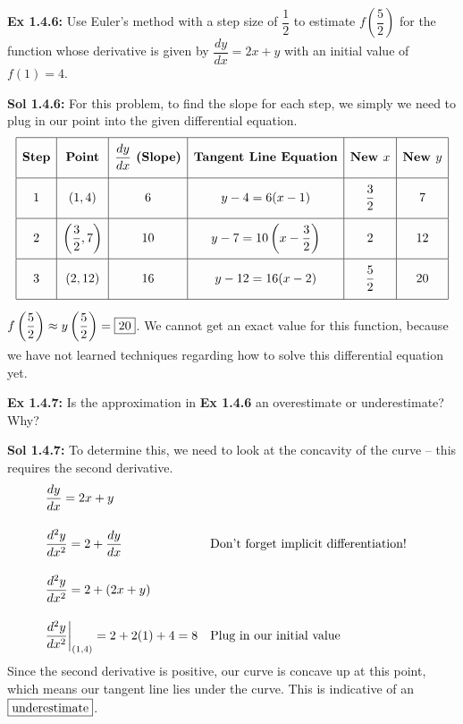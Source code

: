 \begin{tcolorbox}[example]
    \textbf{Ex 1.4.6: } Use Euler's method with a step size of $\dfrac{1}{2}$ to estimate $f\left(\dfrac{5}{2}\right)$ for the function whose derivative is given by $\dfrac{dy}{dx} = 2x + y$ with an initial value of $f(1) = 4$.
\end{tcolorbox}
\begin{tcolorbox}[solution]
    \textbf{Sol 1.4.6: } For this problem, to find the slope for each step, we simply we need to plug in our point into the given differential equation. \begin{align*}
        \def\arraystretch{2.2} 
        \begin{array}{|c|c|c|c|c|c|}
            \hline
            \textbf{Step} & \textbf{Point} & \dfrac{dy}{dx} \textbf{ (Slope)} & \textbf{Tangent Line Equation} & \textbf{New } x & \textbf{New } y \\[5.5pt] \hline
            1 & (1, 4) & 6 & y - 4 = 6(x - 1) & \dfrac{3}{2} & 7 \\[5.5pt] \hline
            2 & \left(\dfrac{3}{2}, 7\right) & 10 & y - 7 = 10\left(x - \dfrac{3}{2}\right) & 2 & 12 \\[5.5pt] \hline
            3 & (2, 12) & 16 & y - 12 = 16(x - 2) & \dfrac{5}{2} & 20 \\[5.5pt]
            \hline
        \end{array}
    \end{align*}
    $f\left(\dfrac{5}{2}\right) \approx y\left(\dfrac{5}{2}\right) = \boxed{20} \forcespace$. We cannot get an exact value for this function, because we have not learned techniques regarding how to solve this differential equation yet.
\end{tcolorbox} \vspace{11pt}

\begin{tcolorbox}[example]
    \textbf{Ex 1.4.7: } Is the approximation in \textbf{Ex 1.4.6} an overestimate or underestimate? Why?
\end{tcolorbox}
\begin{tcolorbox}[solution]
    \textbf{Sol 1.4.7: } To determine this, we need to look at the concavity of the curve -- this requires the second derivative. \begin{align*}
        & \dfrac{dy}{dx} = 2x + y \\[11pt]
        & \dfrac{d^2y}{dx^2} = 2 + \dfrac{dy}{dx} && \text{Don't forget implicit differentiation!} \\[11pt]
        & \dfrac{d^2y}{dx^2} = 2 + (2x + y) \\[11pt]
        & \dfrac{d^2y}{dx^2} \bigg|_{(1, 4)} = 2 + 2(1) + 4 = 8 && \text{Plug in our initial value}
    \end{align*}
    Since the second derivative is positive, our curve is concave up at this point, which means our tangent line lies under the curve. This is indicative of an $\boxed{\text{underestimate}} \smallforcespace$.
\end{tcolorbox}

